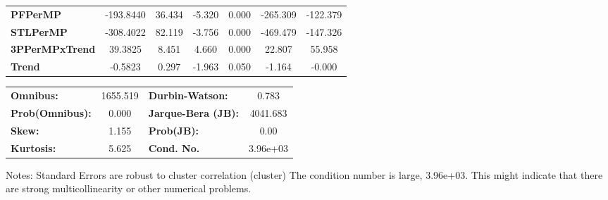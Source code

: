 \begin{center}
\begin{tabular}{lcccccc}
\textbf{PFPerMP}       &    -193.8440  &       36.434     &    -5.320  &         0.000        &     -265.309    &     -122.379     \\
\textbf{STLPerMP}      &    -308.4022  &       82.119     &    -3.756  &         0.000        &     -469.479    &     -147.326     \\
\textbf{3PPerMPxTrend} &      39.3825  &        8.451     &     4.660  &         0.000        &       22.807    &       55.958     \\
\textbf{Trend}         &      -0.5823  &        0.297     &    -1.963  &         0.050        &       -1.164    &       -0.000     \\
\bottomrule
\end{tabular}
\begin{tabular}{lclc}
\textbf{Omnibus:}       & 1655.519 & \textbf{  Durbin-Watson:     } &    0.783  \\
\textbf{Prob(Omnibus):} &   0.000  & \textbf{  Jarque-Bera (JB):  } & 4041.683  \\
\textbf{Skew:}          &   1.155  & \textbf{  Prob(JB):          } &     0.00  \\
\textbf{Kurtosis:}      &   5.625  & \textbf{  Cond. No.          } & 3.96e+03  \\
\bottomrule
\end{tabular}
\end{center}

Notes: \newline
 [1] Standard Errors are robust to cluster correlation (cluster) \newline
 [2] The condition number is large, 3.96e+03. This might indicate that there are \newline
 strong multicollinearity or other numerical problems.
